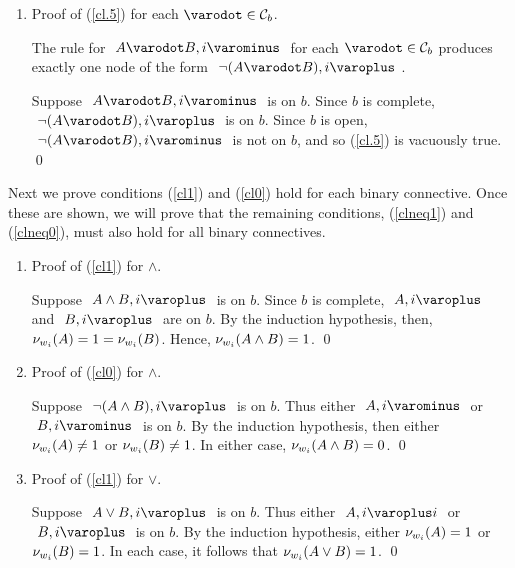 \begin{proof*}
\begin{enumerate}
	\setcounter{enumi}{\value{enumi_saved}}
	\item Proof of (\ref{cl.5}) for each $ \varodot \in \BinaryConnectives $.
		
		The rule for $ \like{ \uNodei{ A \varodot B }} $ for each $ \varodot \in \BinaryConnectives $ produces exactly one node of the form $ \like{ \dNodei{ \neg (A \varodot B)}} $.
		
		Suppose $ \like{ \uNodei{ A \varodot B }} $ is on $b$.
		Since $b$ is complete, $ \like{ \dNodei{ \neg (A \varodot B )}} $ is on $b$.
		Since $b$ is open, $ \like{ \uNodei{ \neg (A \varodot B )}} $ is not on $b$, and so (\ref{cl.5}) is vacuously true.
		\qed

	\setcounter{enumi_saved}{\value{enumi}}
\end{enumerate}
Next we prove conditions (\ref{cl1}) and (\ref{cl0}) hold for each binary connective. Once these are shown, we will prove that the remaining conditions, (\ref{clneq1}) and (\ref{clneq0}), must also hold for all binary connectives.

\begin{enumerate}
	\setcounter{enumi}{\value{enumi_saved}}

	\item Proof of (\ref{cl1}) for $ \wedge $.
	
			Suppose $ \like{ \dNodei{ A \wedge B } } $ is on $ b $.
			Since $ b $ is complete, $ \like{ \dNodei{ A } } $ and $ \like{ \dNodei{ B } } $ are on $ b $.
			By the induction hypothesis, then, $ \mathcal{\nu}_{ w_i }({ A }) = 1 = \mathcal{\nu}_{ w_i }({ B }) $.
			Hence, $ \mathcal{\nu}_{ w_i }({ A \wedge B }) = 1 $.
			\qed

	\item Proof of (\ref{cl0}) for $ \wedge $.
	
			Suppose $ \like{ \dNodei{ \neg (A \wedge B) } } $ is on $b$.
			Thus either $ \like{ \uNodei{ A }} $ or $ \like{ \uNodei{ B }} $ is on $b$.
			By the induction hypothesis, then either $ \mathcal{\nu}_{ w_i }({ A }) \neq 1 $ or $ \mathcal{\nu}_{ w_i }({ B }) \neq 1 $.
			In either case, $ \mathcal{\nu}_{ w_i }({ A \wedge B }) = 0 $.
			\qed

	\item Proof of (\ref{cl1}) for $ \vee $.
			
			Suppose $ \like{ \dNodei{ A \vee B } } $ is on $ b $.
			Thus either $ \like{ \dNodei{ A }{ i } } $ or $ \like{ \dNodei{ B } } $ is on $ b $. 
			By the induction hypothesis, either $ \mathcal{\nu}_{ w_i }({ A }) = 1 $ or $ \mathcal{\nu}_{ w_i }({ B }) = 1 $. 
			In each case, it follows that $ \mathcal{\nu}_{ w_i }({ A \vee B }) = 1 $.
			\qed



\end{enumerate}
\end{proof*}
